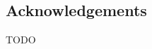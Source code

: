
\vspace*{\fill}
\begin{adjustwidth}{55pt}{55pt}
\section*{Acknowledgements}
TODO
\end{adjustwidth}
\vspace*{\fill}
